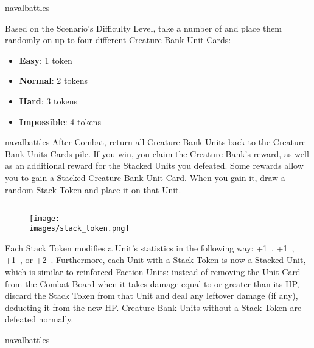 \begin{expansion}[before=\vspace*{-11mm}]{navalbattles}
\begin{multicols*}{2}
  Based on the Scenario's Difficulty Level, take a number of  and place them randomly on up to four different Creature Bank Unit Cards:
  \begin{itemize}
    \item \textbf{Easy}: 1 token
    \item \textbf{Normal}: 2 tokens
    \item \textbf{Hard}: 3 tokens
    \item \textbf{Impossible}: 4 tokens
  \end{itemize}

  \end{multicols*}
\end{expansion}

\begin{multicols*}{2}
\begin{expansion}[before=\vspace*{-11mm}]{navalbattles}
  After Combat, return all Creature Bank Units back to the Creature Bank Units Cards pile.
  If you win, you claim the Creature Bank's reward, as well as an additional reward for the Stacked Units you defeated.
  Some rewards allow you to gain a Stacked Creature Bank Unit Card.
  When you gain it, draw a random Stack Token and place it on that Unit.

  \subsection*{}
  \setlength\intextsep{0pt}
  \setlength\columnsep{1em}
  \begin{wrapfigure}{r}{0.2\linewidth}
    \texttt{[image: \\images/stack\_token.png]}
  \end{wrapfigure}
  Each Stack Token modifies a Unit's statistics in the following way: +1~, +1~, +1~, or +2~.
  Furthermore, each Unit with a Stack Token is now a Stacked Unit, which is similar to reinforced Faction Units: instead of removing the Unit Card from the Combat Board when it takes damage equal to or greater than its HP, discard the Stack Token from that Unit and deal any leftover damage (if any), deducting it from the new HP.
  Creature Bank Units without a Stack Token are defeated normally.
\end{expansion}

\bigskip

\begin{expansion}{navalbattles}

\end{expansion}
\end{multicols*}
